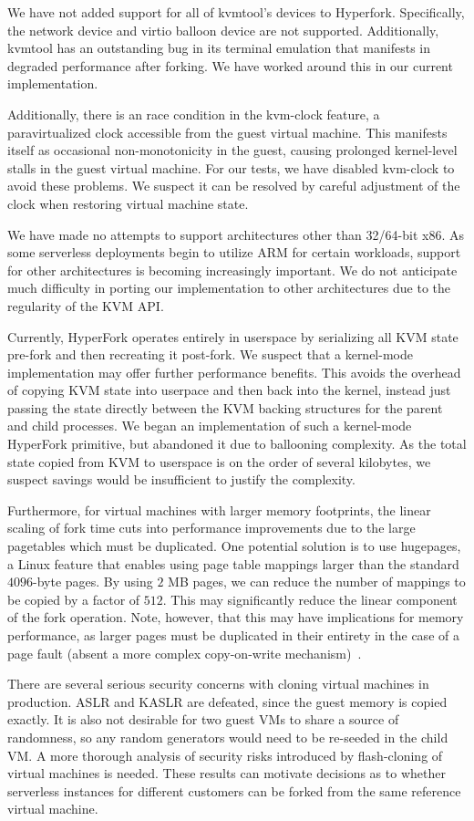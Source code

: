 We have not added support for all of kvmtool's devices to Hyperfork.
Specifically, the network device and virtio balloon device are not
supported. Additionally, kvmtool has an outstanding bug in its terminal
emulation that manifests in degraded performance after forking. We have worked
around this in our current implementation.

Additionally, there is an race condition in the kvm-clock feature, a
paravirtualized clock accessible from the guest virtual machine. This manifests
itself as occasional non-monotonicity in the guest, causing prolonged
kernel-level stalls in the guest virtual machine. For our tests, we have
disabled kvm-clock to avoid these problems. We suspect it can be resolved by
careful adjustment of the clock when restoring virtual machine state.

We have made no attempts to support architectures other than 32/64-bit x86. As
some serverless deployments begin to utilize ARM for certain workloads, support
for other architectures is becoming increasingly important. We do not
anticipate much difficulty in porting our implementation to other architectures
due to the regularity of the KVM API.

 Currently, HyperFork operates entirely in
userspace by serializing all KVM state pre-fork and then recreating it
post-fork. We suspect that a kernel-mode implementation may offer further
performance benefits. This avoids the overhead of copying KVM state into
userpace and then back into the kernel, instead just passing the state directly
between the KVM backing structures for the parent and child processes. We began
an implementation of such a kernel-mode HyperFork primitive, but abandoned it
due to ballooning complexity. As the total state copied from KVM to userspace
is on the order of several kilobytes, we suspect savings would be insufficient
to justify the complexity.

Furthermore, for virtual machines with larger memory footprints, the linear
scaling of fork time cuts into performance improvements due to the large
pagetables which must be duplicated. One potential solution is to use
hugepages, a Linux feature that enables using page table mappings larger than
the standard $4096$-byte pages. By using $2$ MB pages, we can reduce the number
of mappings to be copied by a factor of $512$. This may significantly reduce
the linear component of the fork operation. Note, however, that this may have
implications for memory performance, as larger pages must be duplicated in
their entirety in the case of a page fault (absent a more complex copy-on-write
mechanism)~\cite{hugepages}.

There are several serious security concerns with cloning virtual machines in
production. ASLR and KASLR are defeated, since the guest memory is copied
exactly. It is also not desirable for two guest VMs to share a source of
randomness, so any random generators would need to be re-seeded in the child
VM. A more thorough analysis of security risks introduced by flash-cloning of
virtual machines is needed. These results can motivate decisions as to whether
serverless instances for different customers can be forked from the same
reference virtual machine.
